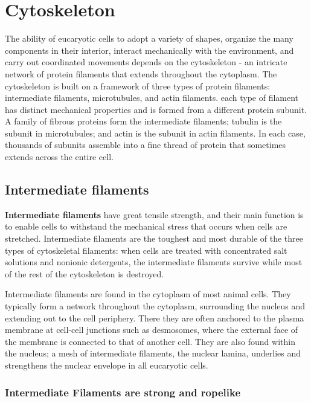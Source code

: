 \chapter{Cytoskeleton}

The ability of eucaryotic cells to adopt a variety of shapes, organize
the many components in their interior, interact mechanically with the
environment, and carry out coordinated movements depends on the
cytoskeleton - an intricate network of protein filaments that extends
throughout the cytoplasm.
The cytoskeleton is built on a framework of three types of protein filaments:
intermediate filaments, microtubules, and actin filaments.
each type of filament has distinct mechanical
properties and is formed from a different protein subunit. A family of
fibrous proteins form the intermediate filaments; tubulin is the subunit
in microtubules; and actin is the subunit in actin filaments. In each case,
thousands of subunits assemble into a fine thread of protein that sometimes
extends across the entire cell.

\section{Intermediate filaments}

\textbf{Intermediate filaments} have great tensile strength, and their main function
is to enable cells to withstand the mechanical stress that occurs when
cells are stretched. Intermediate filaments are the toughest
and most durable of the three types of cytoskeletal filaments: when cells
are treated with concentrated salt solutions and nonionic detergents, the
intermediate filaments survive while most of the rest of the cytoskeleton
is destroyed.

Intermediate filaments are found in the cytoplasm of most animal cells.
They typically form a network throughout the cytoplasm, surrounding
the nucleus and extending out to the cell periphery. There they are often
anchored to the plasma membrane at cell-cell junctions such as desmosomes,
where the external face of the membrane is connected to that of another cell.
They are also found within the nucleus; a mesh of intermediate filaments, the
nuclear lamina, underlies and strengthens the nuclear envelope in all
eucaryotic cells.

\subsection{Intermediate Filaments are strong and ropelike}

